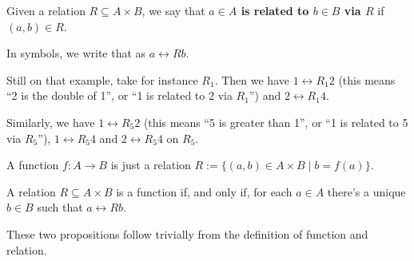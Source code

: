 \begin{df}
	Given a relation $R\subseteq A\times B$, we say that \textbf{$a\in A$ is related to $b\in B$ via $R$} if $(a,b)\in R$.
	
	In symbols, we write that as $a\rel{R}b$.
\end{df}

\begin{ex}
	Still on that example, take for instance $R_1$. Then we have $1\rel{R_1}2$ (this means ``2 is the double of 1'', or ``1 is related to 2 via $R_1$'') and $2\rel{R_1}4$.
	
	Similarly, we have $1\rel{R_5}2$ (this means ``5 is greater than 1'', or ``1 is related to 5 via $R_5$''), $1\rel{R_5}4$ and $2\rel{R_5}4$ on $R_5$.
\end{ex}

\begin{prop}
	A function $f:A\to B$ is just a relation $R:=\{(a,b)\in A\times B\mid b=f(a)\}$.
\end{prop}
\begin{prop}
	A relation $R\subseteq A\times B$ is a function if, and only if, for each $a\in A$ there's a unique $b\in B$ such that $a\rel{R}b$.
\end{prop}

These two propositions follow trivially from the definition of function and relation.

